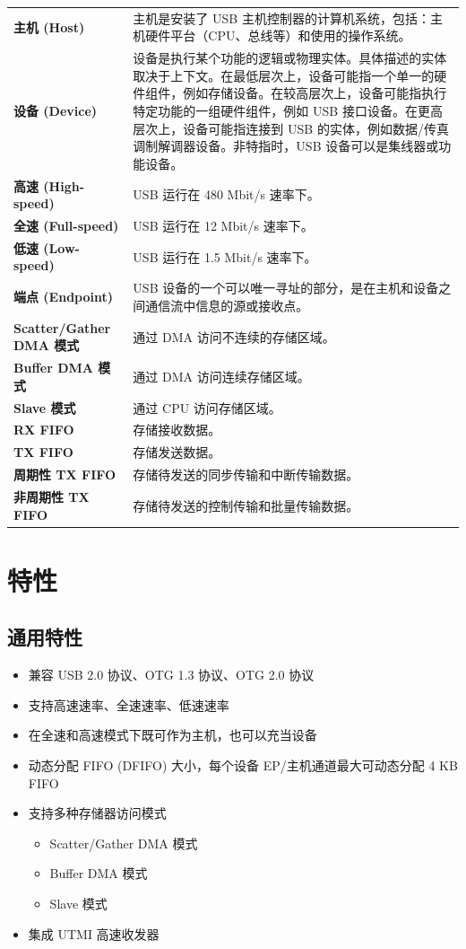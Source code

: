 \documentclass[main\_\_CN.tex]{subfiles}
\begin{document}
\begin{longtable}[c]{ R{5cm} p{10cm} }
\textbf{主机 (Host)}     & 主机是安装了 USB 主机控制器的计算机系统，包括：主机硬件平台（CPU、总线等）和使用的操作系统。\\
\textbf{设备 (Device)}   & 设备是执行某个功能的逻辑或物理实体。具体描述的实体取决于上下文。在最低层次上，设备可能指一个单一的硬件组件，例如存储设备。在较高层次上，设备可能指执行特定功能的一组硬件组件，例如 USB 接口设备。在更高层次上，设备可能指连接到 USB 的实体，例如数据/传真调制解调器设备。非特指时，USB 设备可以是集线器或功能设备。\\
\textbf{高速 (High-speed)}       & USB 运行在 480 Mbit/s 速率下。\\
\textbf{全速 (Full-speed)}  & USB 运行在 12 Mbit/s 速率下。\\
\textbf{低速 (Low-speed)} & USB 运行在 1.5 Mbit/s 速率下。\\
\textbf{端点 (Endpoint)}& USB 设备的一个可以唯一寻址的部分，是在主机和设备之间通信流中信息的源或接收点。\\
\textbf{Scatter/Gather DMA 模式} & 通过 DMA 访问不连续的存储区域。\\
\textbf{Buffer DMA 模式}& 通过 DMA 访问连续存储区域。\\
\textbf{Slave 模式}& 通过 CPU 访问存储区域。\\
\textbf{RX FIFO} & 存储接收数据。 \\
\textbf{TX FIFO} & 存储发送数据。\\
\textbf{周期性 TX FIFO} & 存储待发送的同步传输和中断传输数据。\\
\textbf{非周期性 TX FIFO} & 存储待发送的控制传输和批量传输数据。\\
\end{longtable}

\section{特性}

\subsection{通用特性}
\begin{itemize}
    \item 兼容 USB 2.0 协议、OTG 1.3 协议、OTG 2.0 协议
    \item 支持高速速率、全速速率、低速速率
    \item 在全速和高速模式下既可作为主机，也可以充当设备
    \item 动态分配 FIFO (DFIFO) 大小，每个设备 EP/主机通道最大可动态分配 4 KB FIFO
    \item 支持多种存储器访问模式
    \begin{itemize}
        \item Scatter/Gather DMA 模式
        \item Buffer DMA 模式
        \item Slave 模式
    \end{itemize}
    \item 集成 UTMI 高速收发器
\end{itemize}
\end{document}
